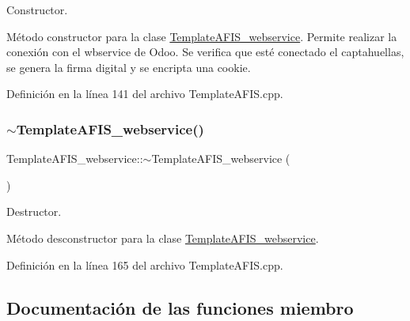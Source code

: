 Constructor. 

Método constructor para la clase \hyperlink{classTemplateAFIS__webservice}{Template\+A\+F\+I\+S\+\_\+webservice}. Permite realizar la conexión con el wbservice de Odoo. Se verifica que esté conectado el captahuellas, se genera la firma digital y se encripta una cookie. 

Definición en la línea 141 del archivo Template\+A\+F\+I\+S.\+cpp.

\hypertarget{classTemplateAFIS__webservice_ad58b565c76e20bdd9272401d7319cb25}{}\label{classTemplateAFIS__webservice_ad58b565c76e20bdd9272401d7319cb25} 
\subsubsection{\texorpdfstring{$\sim$\+Template\+A\+F\+I\+S\+\_\+webservice()}{~TemplateAFIS\_webservice()}}
{\footnotesize\ttfamily Template\+A\+F\+I\+S\+\_\+webservice\+::$\sim$\+Template\+A\+F\+I\+S\+\_\+webservice (\begin{DoxyParamCaption}{ }\end{DoxyParamCaption})}



Destructor. 

Método desconstructor para la clase \hyperlink{classTemplateAFIS__webservice}{Template\+A\+F\+I\+S\+\_\+webservice}. 

Definición en la línea 165 del archivo Template\+A\+F\+I\+S.\+cpp.



\subsection{Documentación de las funciones miembro}
\hypertarget{classTemplateAFIS__webservice_ab867c16199162845402d90191f769b74}{}\label{classTemplateAFIS__webservice_ab867c16199162845402d90191f769b74} 
